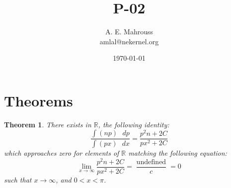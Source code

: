 \documentclass[10pt, twocolumn]{article}
\title{P-02}
\author{A. E. Mahrouss\\amlal@nekernel.org}
\date{\today}
\theoremstyle{plain}
\newtheorem{theorem}{Theorem}[section]
\theoremstyle{definition}
\theoremstyle{remark}
\begin{document}
\maketitle

\section{Theorems}
\begin{theorem}
    There exists in $\mathbb{R}$, the following identity:
    \begin{equation}
        \frac{\int (np) \text{ } dp}{\int (px) \text{ } dx} = \frac{p^2n+2C}{px^2+2C}
    \end{equation}
    which approaches zero for elements of $\mathbb{R}$ matching the following equation:
    \begin{equation}
        \lim_{x\to\infty} \frac{p^2n+2C}{px^2+2C} = \frac{\operatorname{undefined}}{c} = 0
    \end{equation}
    such that $x \to \infty$, and $0 < x < \pi$.
\end{theorem}
\end{document}
